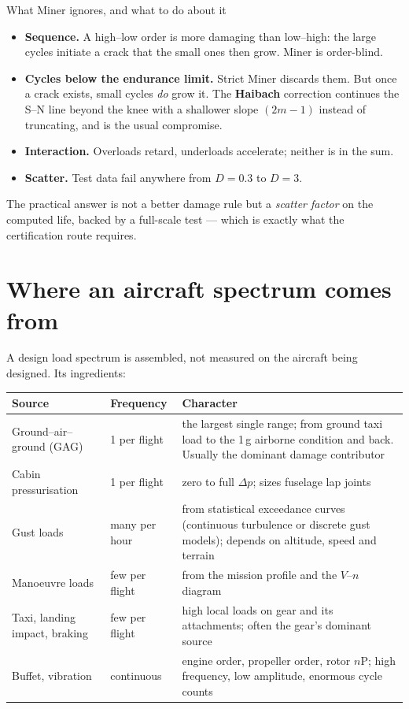 \documentclass[11pt,a4paper]{article}
\begin{document}
\begin{aerobox}{What Miner ignores, and what to do about it}
\begin{itemize}[nosep]
  \item \textbf{Sequence.} A high--low order is more damaging than low--high: the large cycles initiate a crack that the small ones then grow. Miner is order-blind.
  \item \textbf{Cycles below the endurance limit.} Strict Miner discards them. But once a crack exists, small cycles \emph{do} grow it. The \textbf{Haibach} correction continues the S--N line beyond the knee with a shallower slope $(2m-1)$ instead of truncating, and is the usual compromise.
  \item \textbf{Interaction.} Overloads retard, underloads accelerate; neither is in the sum.
  \item \textbf{Scatter.} Test data fail anywhere from $D=0.3$ to $D=3$.
\end{itemize}
The practical answer is not a better damage rule but a \emph{scatter factor} on the computed life, backed by a full-scale test --- which is exactly what the certification route requires.
\end{aerobox}

\section{Where an aircraft spectrum comes from}

A design load spectrum is assembled, not measured on the aircraft being designed. Its ingredients:

\begin{center}\small
\begin{tabular}{@{}llp{6.8cm}@{}}
\toprule
Source & Frequency & Character \\
\midrule
Ground--air--ground (GAG) & 1 per flight & the largest single range; from ground taxi load to the 1\,g airborne condition and back. Usually the dominant damage contributor \\
Cabin pressurisation & 1 per flight & zero to full $\Delta p$; sizes fuselage lap joints \\
Gust loads & many per hour & from statistical exceedance curves (continuous turbulence or discrete gust models); depends on altitude, speed and terrain \\
Manoeuvre loads & few per flight & from the mission profile and the $V$--$n$ diagram \\
Taxi, landing impact, braking & few per flight & high local loads on gear and its attachments; often the gear's dominant source \\
Buffet, vibration & continuous & engine order, propeller order, rotor $n$P; high frequency, low amplitude, enormous cycle counts \\
\bottomrule
\end{tabular}
\end{center}
\end{document}
